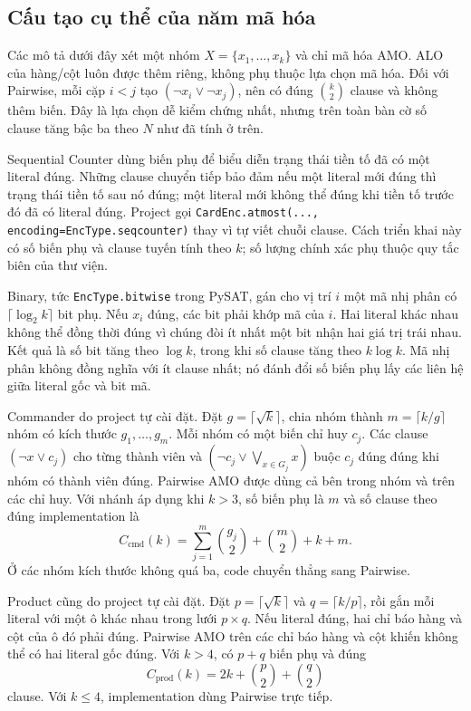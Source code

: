 \subsection{Cấu tạo cụ thể của năm mã hóa}

Các mô tả dưới đây xét một nhóm $X=\{x_1,\ldots,x_k\}$ và chỉ mã hóa AMO.
ALO của hàng/cột luôn được thêm riêng, không phụ thuộc lựa chọn mã hóa.
Đối với Pairwise, mỗi cặp $i<j$ tạo
$(\neg x_i\lor\neg x_j)$, nên có đúng $\binom{k}{2}$ clause và không
thêm biến. Đây là lựa chọn dễ kiểm chứng nhất, nhưng trên toàn bàn cờ
số clause tăng bậc ba theo $N$ như đã tính ở trên.

Sequential Counter dùng biến phụ để biểu diễn trạng thái tiền tố đã có một
literal đúng. Những clause chuyển tiếp bảo đảm nếu một literal mới đúng thì
trạng thái tiền tố sau nó đúng; một literal mới không thể đúng khi tiền tố
trước đó đã có literal đúng. Project gọi
\texttt{CardEnc.atmost(..., encoding=EncType.seqcounter)} thay vì tự viết
chuỗi clause. Cách triển khai này có số biến phụ và clause tuyến tính theo
$k$; số lượng chính xác phụ thuộc quy tắc biên của thư viện.

Binary, tức \texttt{EncType.bitwise} trong PySAT, gán cho vị trí $i$ một
mã nhị phân có $\lceil\log_2 k\rceil$ bit phụ. Nếu $x_i$ đúng, các bit
phải khớp mã của $i$. Hai literal khác nhau không thể đồng thời đúng vì
chúng đòi ít nhất một bit nhận hai giá trị trái nhau. Kết quả là số bit
tăng theo $\log k$, trong khi số clause tăng theo $k\log k$. Mã nhị phân
không đồng nghĩa với ít clause nhất; nó đánh đổi số biến phụ lấy các
liên hệ giữa literal gốc và bit mã.

Commander do project tự cài đặt. Đặt $g=\lceil\sqrt{k}\rceil$, chia nhóm
thành $m=\lceil k/g\rceil$ nhóm có kích thước $g_1,\ldots,g_m$.
Mỗi nhóm có một biến chỉ huy $c_j$. Các clause
$(\neg x\lor c_j)$ cho từng thành viên và
$(\neg c_j\lor\bigvee_{x\in G_j}x)$ buộc $c_j$ đúng đúng khi nhóm
có thành viên đúng. Pairwise AMO được dùng cả bên trong nhóm và trên
các chỉ huy. Với nhánh áp dụng khi $k>3$, số biến phụ là $m$ và số
clause theo đúng implementation là
\begin{equation}
 C_{\mathrm{cmd}}(k)
 =\sum_{j=1}^{m}\binom{g_j}{2}+\binom{m}{2}+k+m.
\end{equation}
Ở các nhóm kích thước không quá ba, code chuyển thẳng sang Pairwise.

Product cũng do project tự cài đặt. Đặt
$p=\lceil\sqrt{k}\rceil$ và $q=\lceil k/p\rceil$, rồi gắn mỗi literal
với một ô khác nhau trong lưới $p\times q$. Nếu literal đúng, hai chỉ
báo hàng và cột của ô đó phải đúng. Pairwise AMO trên các chỉ báo hàng
và cột khiến không thể có hai literal gốc đúng. Với $k>4$, có $p+q$
biến phụ và đúng
\begin{equation}
 C_{\mathrm{prod}}(k)
 =2k+\binom{p}{2}+\binom{q}{2}
\end{equation}
clause. Với $k\leq4$, implementation dùng Pairwise trực tiếp.

